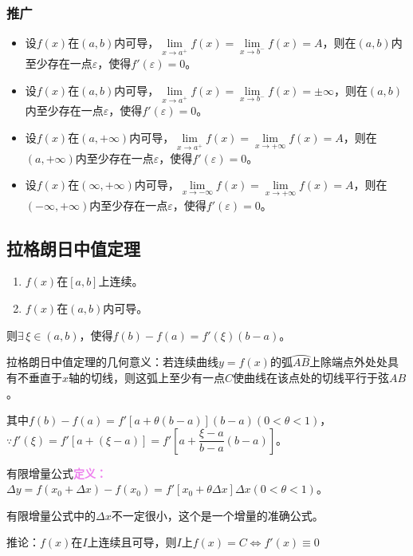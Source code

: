\documentclass[UTF8, 12pt]{ctexart}
\begin{document}
\subsubsection{推广}

\begin{itemize}
    \item 设$f(x)$在$(a,b)$内可导，$\lim\limits_{x\to a^+}f(x)=\lim\limits_{x\to b^-}f(x)=A$，则在$(a,b)$内至少存在一点$\varepsilon$，使得$f'(\varepsilon)=0$。
    \item 设$f(x)$在$(a,b)$内可导，$\lim\limits_{x\to a^+}f(x)=\lim\limits_{x\to b^-}f(x)=\pm\infty$，则在$(a,b)$内至少存在一点$\varepsilon$，使得$f'(\varepsilon)=0$。
    \item 设$f(x)$在$(a,+\infty)$内可导，$\lim\limits_{x\to a^+}f(x)=\lim\limits_{x\to+\infty}f(x)=A$，则在$(a,+\infty)$内至少存在一点$\varepsilon$，使得$f'(\varepsilon)=0$。
    \item 设$f(x)$在$(\infty,+\infty)$内可导，$\lim\limits_{x\to-\infty}f(x)=\lim\limits_{x\to+\infty}f(x)=A$，则在$(-\infty,+\infty)$内至少存在一点$\varepsilon$，使得$f'(\varepsilon)=0$。
\end{itemize}

\subsection{拉格朗日中值定理}

\begin{enumerate}
    \item $f(x)$在$[a,b]$上连续。
    \item $f(x)$在$(a,b)$内可导。
\end{enumerate}

则$\exists\,\xi\in(a,b)$，使得$f(b)-f(a)=f'(\xi)(b-a)$。

拉格朗日中值定理的几何意义：若连续曲线$y=f(x)$的弧$\wideparen{AB}$上除端点外处处具有不垂直于$x$轴的切线，则这弧上至少有一点$C$使曲线在该点处的切线平行于弦$AB$。

其中$f(b)-f(a)=f'[a+\theta(b-a)](b-a)(0<\theta<1)$，$\because f'(\xi)=f'[a+(\xi-a)]=f'[a+\dfrac{\xi-a}{b-a}(b-a)]$。\medskip

有限增量公式\textcolor{violet}{\textbf{定义：}}$\Delta y=f(x_0+\Delta x)-f(x_0)=f'[x_0+\theta\Delta x]\Delta x(0<\theta<1)$。

有限增量公式中的$\Delta x$不一定很小，这个是一个增量的准确公式。

推论：$f(x)$在$I$上连续且可导，则$I$上$f(x)=C\Leftrightarrow f'(x)\equiv 0$
\end{document}
